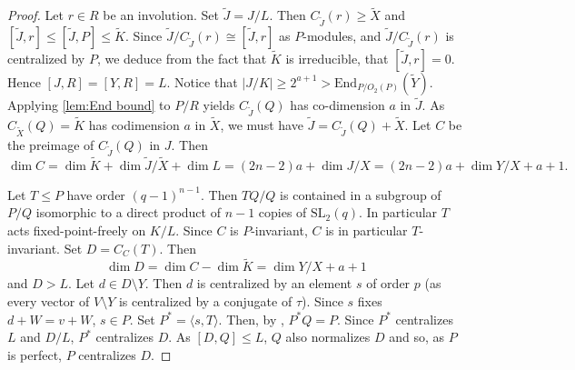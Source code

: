 \documentclass[12pt]{amsart}
\theoremstyle{remark}
\theoremstyle{notation}
\theoremstyle{definition}
\newcommand{\SL}{\mathrm{SL}}
\newcommand{\0}{\emptyset}
\begin{document}
\begin{proof}
 Let $r \in R$ be an involution. Set $\widetilde J=J/L$. Then $C_{\widetilde J}(r) \ge \widetilde X$ and $[\widetilde J,r] \le [\widetilde J,P] \le \widetilde K$. Since $\widetilde J/C_{\widetilde J}(r)\cong [\widetilde J, r]$ as $P$-modules, and $\widetilde J/C_{\widetilde J}(r)$ is centralized by $P$, we deduce from the fact that $\widetilde K$ is irreducible, that $[\widetilde J, r]=0$. Hence $[J,R]=[Y,R]=L$. Notice that $|J/K|\ge 2^{a+1}> \mathrm{End}_{P/O_2(P)}(\widetilde Y)$. Applying \cref{lem:End bound} to $P/R$ yields
 $C_{\widetilde J}(Q)$ has co-dimension $a$ in $\widetilde J$.  As $C_{\widetilde X}(Q)= \widetilde K$ has codimension $a$ in $\widetilde X$, we must have $\widetilde J= C_{\widetilde J}(Q)+\widetilde X$. Let $C$ be the preimage of $C_{\widetilde J}(Q)$ in $J$.  Then $$\dim C= \dim \widetilde K + \dim \widetilde J/\widetilde X +\dim L = (2n-2)a+\dim J/X=(2n-2)a+\dim Y/X +a+1.$$









  Let $T\le P$ have order $(q-1)^{n-1}$. Then $TQ/Q$ is contained in a subgroup of $P/Q$ isomorphic to a direct product of $n-1$ copies of  $\SL_2(q)$. In particular $T$ acts fixed-point-freely on $K/L$.  Since $C$ is $P$-invariant, $C$ is in particular $T$-invariant.  Set $D= C_C(T)$.  Then $$\dim D=\dim C-\dim \widetilde K= \dim Y/X+a +1$$ and $D>L$. Let $d \in D \setminus Y$. Then $d$ is centralized by an element $s$ of order $p$ (as every vector of $V\setminus Y$ is centralized by a conjugate of $\tau$). Since $s$ fixes $d+W=v+W$, $s\in P$.  Set $P^*= \langle s,T\rangle$.  Then, by \cite[Main Theorem]{GuralnickPentillaPraegerSaxl}, $P^* Q=P$. Since $P^*$ centralizes $L$ and $D/L$, $P^*$ centralizes $D$. As $[D,Q]\le L$, $Q$ also normalizes $D$ and so, as $P$ is perfect, $P$ centralizes $ D$.



\end{proof}
\end{document}
